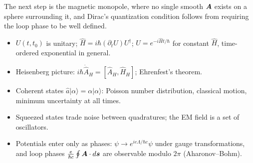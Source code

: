 The next step is the magnetic monopole, where no single smooth $\vect{A}$ exists on a sphere surrounding it, and Dirac's quantization condition follows from requiring the loop phase to be well defined.

\begin{fact}
\leavevmode
\begin{itemize}
\item $U(t,t_0)$ is unitary; $\hat{H} = i\hbar(\partial_tU)U^\dagger$; $U = e^{-i\hat{H}t/\hbar}$ for constant $\hat{H}$, time-ordered exponential in general.
\item Heisenberg picture: $i\hbar\dot{\hat{A}}_H = [\hat{A}_H,\hat{H}_H]$; Ehrenfest's theorem.
\item Coherent states $\hat{a}|\alpha\rangle = \alpha|\alpha\rangle$: Poisson number distribution, classical motion, minimum uncertainty at all times.
\item Squeezed states trade noise between quadratures; the EM field is a set of oscillators.
\item Potentials enter only as phases: $\psi\to e^{ie\Lambda/\hbar c}\psi$ under gauge transformations, and loop phases $\frac{e}{\hbar c}\oint\vect{A}\cdot d\lvect{s}$ are observable modulo $2\pi$ (Aharonov--Bohm).
\end{itemize}
\end{fact}
